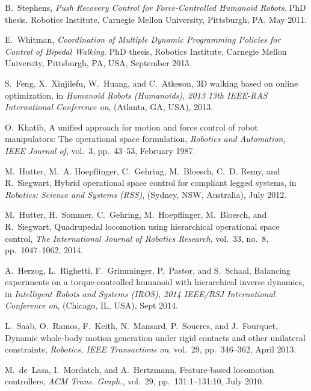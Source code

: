 \documentclass{ws-ijhr}
\begin{document}
\begin{thebibliography}{10}

B.~Stephens, {\em Push Recovery Control for Force-Controlled Humanoid Robots}.
\newblock PhD thesis, Robotics Institute, Carnegie Mellon University,
  Pittsburgh, PA, May 2011.

E.~Whitman, {\em Coordination of Multiple Dynamic Programming Policies for
  Control of Bipedal Walking}.
\newblock PhD thesis, Robotics Institute, Carnegie Mellon University,
  Pittsburgh, PA, USA, September 2013.

S.~Feng, X.~Xinjilefu, W.~Huang, and C.~Atkeson, {3D} walking based on online
  optimization, in {\em Humanoid Robots (Humanoids), 2013 13th IEEE-RAS
  International Conference on}, (Atlanta, GA, USA), 2013.

O.~Khatib, A unified approach for motion and force control of robot
  manipulators: The operational space formulation, {\em Robotics and
  Automation, IEEE Journal of}, vol.~3, pp.~43--53, February 1987.

M.~Hutter, M.~A. Hoepflinger, C.~Gehring, M.~Bloesch, C.~D. Remy, and
  R.~Siegwart, Hybrid operational space control for compliant legged
  systems, in {\em Robotics: Science and Systems (RSS)}, (Sydney, NSW,
  Australia), July 2012.

M.~Hutter, H.~Sommer, C.~Gehring, M.~Hoepflinger, M.~Bloesch, and R.~Siegwart,
  Quadrupedal locomotion using hierarchical operational space control, {\em
  The International Journal of Robotics Research}, vol.~33, no.~8,
  pp.~1047--1062, 2014.

A.~Herzog, L.~Righetti, F.~Grimminger, P.~Pastor, and S.~Schaal, Balancing
  experiments on a torque-controlled humanoid with hierarchical inverse
  dynamics, in {\em Intelligent Robots and Systems (IROS), 2014 IEEE/RSJ
  International Conference on}, (Chicago, IL, USA), Sept 2014.

L.~Saab, O.~Ramos, F.~Keith, N.~Mansard, P.~Soueres, and J.~Fourquet, Dynamic
  whole-body motion generation under rigid contacts and other unilateral
  constraints, {\em Robotics, IEEE Transactions on}, vol.~29, pp.~346--362,
  April 2013.

M.~de~Lasa, I.~Mordatch, and A.~Hertzmann, Feature-based locomotion
  controllers, {\em ACM Trans. Graph.}, vol.~29, pp.~131:1--131:10, July
  2010.


\end{thebibliography}
\end{document}

